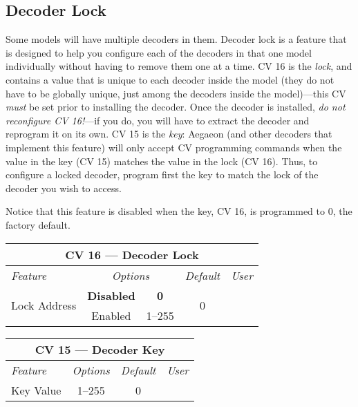 \documentclass[12pt,letterpaper,draft]{memoir} %
\begin{document}
\subsection{Decoder Lock}
Some models will have multiple decoders in them. Decoder lock is a feature that is designed to help you configure each of the decoders in that one model individually without having to remove them one at a time. CV 16 is the \textit{lock}, and contains a value that is unique to each decoder inside the model (they do not have to be globally unique, just among the decoders inside the model)---this CV \textit{must} be set prior to installing the decoder. Once the decoder is installed, \textit{do not reconfigure CV 16!}---if you do, you will have to extract the decoder and reprogram it on its own. CV 15 is the \textit{key}: Aegaeon (and other decoders that implement this feature) will only accept CV programming commands when the value in the key (CV 15) matches the value in the lock (CV 16). Thus, to configure a locked decoder, program first the key to match the lock of the decoder you wish to access.

Notice that this feature is disabled when the key, CV 16, is programmed to 0, the factory default.

\label{CV16}
\begin{center}
\begin{tabular}{|l|c|c|c|c|}
\hline
\multicolumn{5}{|c|}{\textbf{CV 16 --- Decoder Lock}} \\ \hline \hline
\textit{Feature} & \multicolumn{2}{c|}{\textit{Options}} & \textit{Default} & \textit{User} \\ \hline
\multirow{2}{*}{Lock Address} & \textbf{Disabled} & \textbf{0} & \multirow{2}{*}{0} & \\
 & Enabled & 1--255 &  &\\ \hline
\end{tabular}
\end{center}

\label{CV15}
\begin{center}
\begin{tabular}{|l|c|c|c|}
\hline
\multicolumn{4}{|c|}{\textbf{CV 15 --- Decoder Key}} \\ \hline \hline
\textit{Feature} & \textit{Options} & \textit{Default} & \textit{User} \\ \hline
Key Value & 1--255 & 0 &\\ \hline
\end{tabular}
\end{center}
\end{document}
